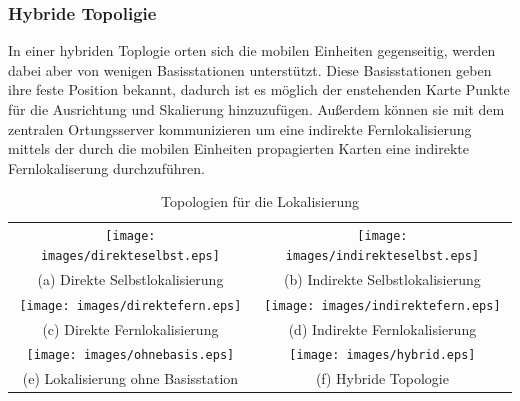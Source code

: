\subsubsection{Hybride Topoligie}
In einer hybriden Toplogie orten sich die mobilen Einheiten gegenseitig, werden dabei aber von wenigen Basisstationen unterstützt.
Diese Basisstationen geben ihre feste Position bekannt, dadurch ist es möglich der enstehenden Karte Punkte für die Ausrichtung und Skalierung hinzuzufügen.
Außerdem können sie mit dem zentralen Ortungsserver kommunizieren um eine indirekte Fernlokalisierung mittels der durch die mobilen Einheiten propagierten Karten eine indirekte Fernlokaliserung durchzuführen.


\begin{table}[h!]
	\centering
	\caption{Topologien für die Lokalisierung}
	\label{table:topo}
	\begin{tabular}{cc}
		\texttt{[image: images/direkteselbst.eps]} & \texttt{[image: images/indirekteselbst.eps]} \\
		(a) Direkte Selbstlokalisierung & (b) Indirekte Selbstlokalisierung \\
		\texttt{[image: images/direktefern.eps]} & \texttt{[image: images/indirektefern.eps]} \\
		(c) Direkte Fernlokalisierung & (d) Indirekte Fernlokalisierung \\
		\texttt{[image: images/ohnebasis.eps]} & \texttt{[image: images/hybrid.eps]} \\
		(e) Lokalisierung ohne Basisstation & (f) Hybride Topologie \\
	\end{tabular}
\end{table}

